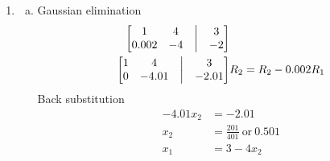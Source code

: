 \documentclass[12pt, letterpaper]{article}
\begin{document}
\begin{enumerate}
\begin{enumerate}[(a)]
\begin{align*}
\begin{bmatrix}
                        0 & 0 & \frac{12}5  & \bigm| & \frac{23}5
                    \end{bmatrix}& R_3 = R_3 + \frac{12}5R_1\\
                \end{align*}
            \item Back substitution
                \begin{align*}
                    \frac{12}5 x_3 &= \frac{23}{12} \\
                    x_3 &= \frac{115}{144} \\
                    \frac52 x_2 &= \frac32x_3 + \frac32 \\
                    x_2 &= \frac35(\frac{115}{144})+\frac35 \\
                        &= \frac{259}{240} \\
                    x_1 &= -1 + 4x_2 - 2x_3 \\
                        &= -1 + \frac{259}{60} - \frac{115}{72} \\ 
                        &= \frac{619}{360}
                \end{align*}
        \end{enumerate}
    \item %
        \begin{enumerate}[(a)]
            \item Gaussian elimination
                \begin{align*}
                    \begin{bmatrix}
                        1     &   4 &  \bigm| & 3\\
                        0.002 &  -4 &  \bigm| & -2 
                    \end{bmatrix}& \\
                    \begin{bmatrix}
                        1 & 4 &  \bigm| & 3\\
                        0 & -4.01 &  \bigm| & -2.01 
                    \end{bmatrix}& R_2 = R_2 - 0.002R_1\\
                \end{align*}
                Back substitution
                \begin{align*}
                    -4.01x_2&=-2.01 \\
                    x_2 &= \frac{201}{401}\ \text{or}\ 0.501\\ 
                    x_1 &= 3 - 4x_2 \\

\end{align*}
\end{enumerate}
\end{enumerate}
\end{document}
